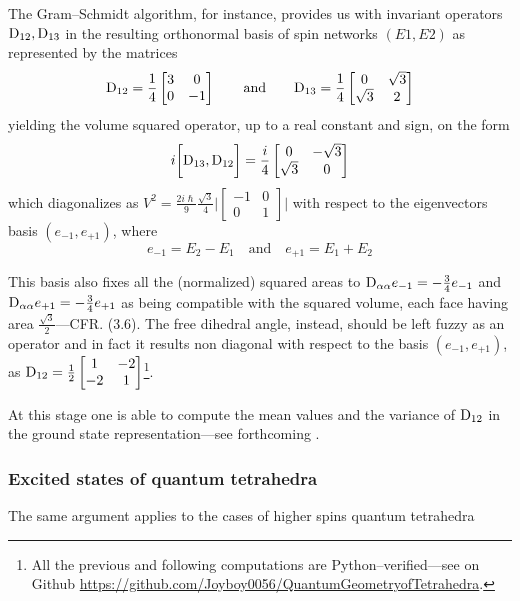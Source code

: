 The Gram--Schmidt algorithm, for instance, provides us with invariant operators $\text{\normalfont D}_{12}, \text{\normalfont D}_{13}$ in the resulting orthonormal basis of spin networks $(E1,E2)$ as represented by the matrices
$$\text{\normalfont D}_{12}=\frac{1}{4}\begin{bmatrix}
        3&0\\
        0&-1
\end{bmatrix}\qquad\text{and}\qquad\text{\normalfont D}_{13}=\frac{1}{4}\begin{bmatrix}
    0&\sqrt{3}\\
    \sqrt{3}&2
\end{bmatrix}$$
yielding the volume squared operator, up to a real constant and sign, on the form
$$i\bigg[\text{\normalfont D}_{13},\text{\normalfont D}_{12}\bigg]=\frac{i}{4}\begin{bmatrix}
    0&-\sqrt{3}\\
    \sqrt{3}&0
\end{bmatrix}$$
which diagonalizes as $V^2=\frac{2i\hslash}{9}\frac{\sqrt{3}}{4}\Biggl|\begin{bmatrix}
    -1&0\\
    0&1
\end{bmatrix}\Biggl|$ with respect to the eigenvectors basis $(e_{-1}, e_{+1})$, where
$$e_{-1}=E_2-E_1\quad\text{and}\quad e_{+1}=E_1+E_2$$

This basis also fixes all the (normalized) squared areas to $\text{\normalfont D}_{\alpha\alpha}e_{-1}=-\frac{3}{4}e_{-1}$ and $\text{\normalfont D}_{\alpha\alpha}e_{+1}=-\frac{3}{4}e_{+1}$ as being compatible with the squared volume, each face having area $\frac{\sqrt{3}}{2}$---CFR. (3.6). The free dihedral angle, instead, should be left fuzzy as an operator and in fact it results non diagonal with respect to the basis $(e_{-1},e_{+1})$, as $\text{\normalfont D}_{12}=\frac{1}{2}\begin{bmatrix}
    1&-2\\
    -2&1
\end{bmatrix}$\footnote{All the previous and following computations are Python--verified---see on Github \href{Joyboy0056/QuantumGeometryofTetrahedra}{https://github.com/Joyboy0056/QuantumGeometryofTetrahedra}.}.  

At this stage one is able to compute the mean values and the variance of $\text{\normalfont D}_{12}$ in the ground state representation---see forthcoming \cite{LNX}.

\subsubsection{Excited states of quantum tetrahedra}
The same argument applies to the cases of higher spins quantum tetrahedra 

